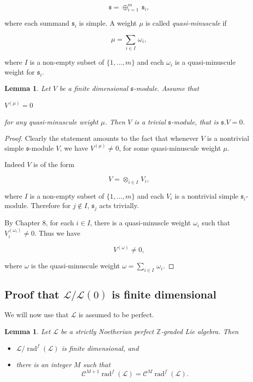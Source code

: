 \documentclass[11pt, letterpaper, reqno]{amsart}
\newtheorem{lemma}[theorem]{Lemma}
\theoremstyle{definition}
\newcommand{\rad}{\operatorname{rad}}
\newcommand{\Z}{{\mathbb Z}}
\newcommand{\cC}{\mathcal C}
\newcommand{\cL}{\mathcal L}
\newcommand{\fs}{\mathfrak{s}}
\begin{document}
$$\fs=\oplus_{i=1}^m\,\fs_i,$$

\noindent where each summand $\fs_i$ is simple.
A  weight $\mu$ is called 
{\it quasi-minuscule} if

$$\mu=\sum_{i\in I}\,\omega_i,$$

\noindent where $I$ is a non-empty subset
of $\{1,\ldots,m\}$ and each $\omega_i$ is a
quasi-minuscule weight for $\fs_i$.

\begin{lemma}\label{quasiminuscule}
Let $V$ be a finite dimensional $\fs$-module. Assume that 

\centerline{$V^{(\mu)}=0$}
 
 \noindent for any  quasi-minuscule weight $\mu$. Then $V$ is a trivial $\fs$-module, that is $\fs.V = 0$.
\end{lemma}

\begin{proof}  Clearly the statement amounts to the fact that whenever $V$ is a nontrivial
simple $\fs$-module $V$, we have $V^{(\mu)}\neq 0$, for some  quasi-minuscule weight $\mu$. 

Indeed $V$ is of the form

$$V=\otimes_{i\in I}\, V_i,$$

\noindent where $I$ is a non-empty subset
of $\{1,\ldots,m\}$ and each $V_i$ is a 
nontrivial simple $\fs_i$-module. Therefore for
$j\not\in I$, $\fs_j$ acts trivially.



By \cite{Bourbaki} {Chapter 8}, for each
$i\in I$, there is a quasi-minuscle weight 
$\omega_i$ such that $V_i^{(\omega_i)}\neq 0$.
Thus we have

$$V^{(\omega)}\neq 0,$$

\noindent where $\omega$ is the quasi-minuscule weight $\omega=\sum_{i\in I}\,\omega_i$.
\end{proof}


\subsection{Proof that $\cL/\cL{(0)}$ is finite dimensional}
\label{secL/L0}

We will now use that $\cL$ is assumed to be perfect.



\begin{lemma}\label{stable} Let $\cL$ be a  strictly 
Noetherian perfect $\Z$-graded Lie algebra.
Then 

\begin{itemize}
\item[(a)] $\cL/\rad^f(\cL)$ is finite dimensional, and
\item[(b)] there is an integer $M$ such that
$$\cC^{M+1} \rad^f(\cL)=
\cC^M \rad^f(\cL).$$
\end{itemize}
\end{lemma}
\end{document}

